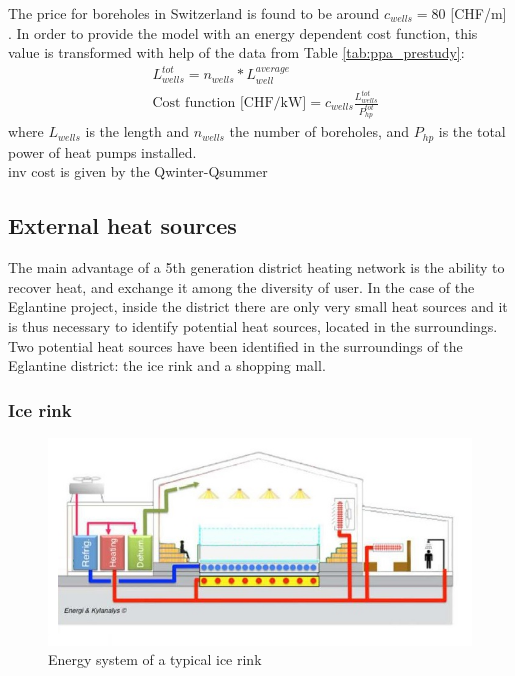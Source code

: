 \documentclass{article}
\begin{document}
The price for boreholes in Switzerland is found to be around $c_{wells} = 80$ [CHF/m] \cite{bawos.chMitErdsondenbohrungenKosten2018}. 
In order to provide the model with an energy dependent cost function, this value is transformed with help of the data from Table \ref{tab:ppa_prestudy}:
\begin{align}
&  L_{wells}^{tot} = n_{wells} * L_{well}^{average} \\
& 	\text{Cost function [CHF/kW]} = c_{wells} \frac{L_{wells}^{tot}}{P_{hp}^{tot}}
\end{align}
where $L_{wells}$ is the length and $n_{wells}$ the number of boreholes, and $P_{hp}$ is the total power of heat pumps installed.\\

inv cost is given by the Qwinter-Qsummer
\subsection{External heat sources}
The main advantage of a 5th generation district heating network is the ability to recover heat, and exchange it among the diversity of user. In the case of the Eglantine project, inside the district there are only very small heat sources and it is thus necessary to identify potential heat sources, located in the surroundings. 
Two potential heat sources have been identified in the surroundings of the Eglantine district: the ice rink and a shopping mall.

\subsubsection{Ice rink}

\begin{figure}[htp]
	\centering
	\includegraphics[width=1\textwidth]{IR_schema.JPG}
	\caption{Energy system of a typical ice rink \cite{gronqvistComparativeLifecycleCost}}
	\label{fig:IR_schema}
\end{figure}
\end{document}
